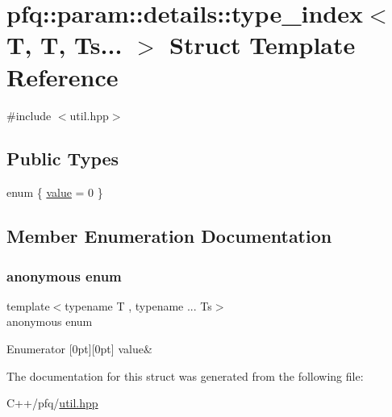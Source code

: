 \hypertarget{structpfq_1_1param_1_1details_1_1type__index_3_01T_00_01T_00_01Ts_8_8_8_01_4}{}\section{pfq\+:\+:param\+:\+:details\+:\+:type\+\_\+index$<$ T, T, Ts... $>$ Struct Template Reference}
\label{structpfq_1_1param_1_1details_1_1type__index_3_01T_00_01T_00_01Ts_8_8_8_01_4}


{\ttfamily \#include $<$util.\+hpp$>$}

\subsection*{Public Types}
\begin{DoxyCompactItemize}
\item 
enum \{ \hyperlink{structpfq_1_1param_1_1details_1_1type__index_3_01T_00_01T_00_01Ts_8_8_8_01_4_a526e52730fcbaf8cb5f30523f3f4885fa4d9cd56fc4c1815fa4b3de02e03e3e1f}{value} = 0
 \}
\end{DoxyCompactItemize}


\subsection{Member Enumeration Documentation}
\mbox{\label{structpfq_1_1param_1_1details_1_1type__index_3_01T_00_01T_00_01Ts_8_8_8_01_4_a526e52730fcbaf8cb5f30523f3f4885f}} 
\subsubsection{\texorpdfstring{anonymous enum}{anonymous enum}}
{\footnotesize\ttfamily template$<$typename T , typename ... Ts$>$ \\
anonymous enum}

\begin{DoxyEnumFields}{Enumerator}
[0pt][0pt]{}\mbox{\label{structpfq_1_1param_1_1details_1_1type__index_3_01T_00_01T_00_01Ts_8_8_8_01_4_a526e52730fcbaf8cb5f30523f3f4885fa4d9cd56fc4c1815fa4b3de02e03e3e1f}} 
value&\\
\hline

\end{DoxyEnumFields}


The documentation for this struct was generated from the following file\+:\begin{DoxyCompactItemize}
\item 
C++/pfq/\hyperlink{util_8hpp}{util.\+hpp}\end{DoxyCompactItemize}
